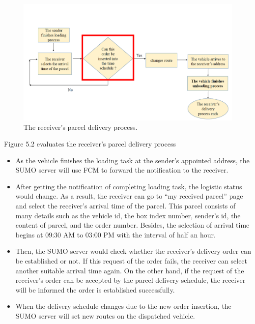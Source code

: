 \documentclass[12pt]{ksthesis}
\begin{document}
\begin{thesis}
{\begin{figure}[H]
\centering
\includegraphics[width=1.14\textwidth]{./Thesis_figures/F5-2_receiver_delivery_process.PNG}
\caption{\large The receiver's parcel delivery process.}
\vspace{0.5cm}
\label{Fig:receiver_process}
\end{figure}

Figure 5.2 evaluates the receiver’s parcel delivery process

\begin{itemize}
\item
As the vehicle finishes the loading task at the sender’s appointed address, the SUMO server will use FCM to forward the notification to the receiver.

\item
After getting the notification of completing loading task, the logistic status would change. As a result, the receiver can go to “my received parcel” page and select the receiver’s arrival time of the parcel. This parcel consists of many details such as the vehicle id, the box index number, sender’s id, the content of parcel, and the order number. Besides, the selection of arrival time begins at 09:30 AM to 03:00 PM with the interval of half an hour.

\item
Then, the SUMO server would check whether the receiver’s delivery order can be established or not. If this request of the order fails, the receiver can select another suitable arrival time again. On the other hand, if the request of the receiver’s order can be accepted by the parcel delivery schedule, the receiver will be informed the order is established successfully.

\item
When the delivery schedule changes due to the new order insertion, the SUMO server will set new routes on the dispatched vehicle.


\end{itemize}}
\end{thesis}
\end{document}
